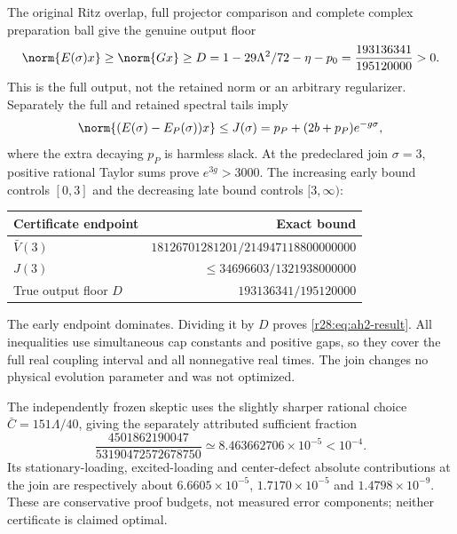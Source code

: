 The original Ritz overlap, full projector comparison and complete complex preparation ball give the genuine output floor
\begin{equation}
 \norm{E(\sigma)x}\ge\norm{Gx}\ge
 D=1-29\Lambda^2/72-\eta-p_0
 =\frac{193136341}{195120000}>0.
 \label{r28:eq:ah2-true-D}
\end{equation}
This is the full output, not the retained norm or an arbitrary regularizer. Separately the full and retained spectral tails imply
\begin{equation}
 \norm{(E(\sigma)-E_P(\sigma))x}\le
 J(\sigma)=p_P+(2b+p_P)e^{-g\sigma},
 \label{r28:eq:ah2-J}
\end{equation}
where the extra decaying $p_P$ is harmless slack. At the predeclared join $\sigma=3$, positive rational Taylor sums prove $e^{3g}>3000$. The increasing early bound controls $[0,3]$ and the decreasing late bound controls $[3,\infty)$:
\begin{center}\small
\begin{tabular}{@{}lr@{}}\toprule
Certificate endpoint & Exact bound\\\midrule
$\bar V(3)$ & $18126701281201/214947118800000000$\\
$J(3)$ & $\le34696603/1321938000000$\\
True output floor $D$ & $193136341/195120000$\\\bottomrule
\end{tabular}
\end{center}
The early endpoint dominates. Dividing it by $D$ proves \eqref{r28:eq:ah2-result}. All inequalities use simultaneous cap constants and positive gaps, so they cover the full real coupling interval and all nonnegative real times. The join changes no physical evolution parameter and was not optimized.

The independently frozen skeptic uses the slightly sharper rational choice $\bar C=151\Lambda/40$, giving the separately attributed sufficient fraction
\begin{equation}
 \frac{4501862190047}{53190472572678750}
 \simeq8.463662706\times10^{-5}<10^{-4}.
\end{equation}
Its stationary-loading, excited-loading and center-defect absolute contributions at the join are respectively about $6.6605\times10^{-5}$, $1.7170\times10^{-5}$ and $1.4798\times10^{-9}$. These are conservative proof budgets, not measured error components; neither certificate is claimed optimal.

